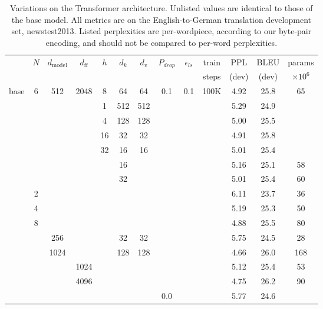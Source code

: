 \documentclass{article}
\newcommand{\dmodel}{d_{\text{model}}}
\newcommand{\dff}{d_{\text{ff}}}
\begin{document}
\begin{table}[t]
\caption{Variations on the Transformer architecture. Unlisted values are identical to those of the base model.  All metrics are on the English-to-German translation development set, newstest2013.  Listed perplexities are per-wordpiece, according to our byte-pair encoding, and should not be compared to per-word perplexities.}
\label{tab:variations}
\begin{center}
\vspace{-2mm}
\begin{tabular}{c|ccccccccc|ccc}
\hline\rule{0pt}{2.0ex}
 & \multirow{2}{*}{$N$} & \multirow{2}{*}{$\dmodel$} &
\multirow{2}{*}{$\dff$} & \multirow{2}{*}{$h$} & 
\multirow{2}{*}{$d_k$} & \multirow{2}{*}{$d_v$} & 
\multirow{2}{*}{$P_{drop}$} & \multirow{2}{*}{$\epsilon_{ls}$} &
train & PPL & BLEU & params \\
 & & & & & & & & & steps & (dev) & (dev) & $\times10^6$ \\
\hline\rule{0pt}{2.0ex}
base & 6 & 512 & 2048 & 8 & 64 & 64 & 0.1 & 0.1 & 100K & 4.92 & 25.8 & 65 \\
\hline\rule{0pt}{2.0ex}
\multirow{4}{*}{(A)}
& & & & 1 & 512 & 512 & & & & 5.29 & 24.9 &  \\
& & & & 4 & 128 & 128 & & & & 5.00 & 25.5 &  \\
& & & & 16 & 32 & 32 & & & & 4.91 & 25.8 &  \\
& & & & 32 & 16 & 16 & & & & 5.01 & 25.4 &  \\
\hline\rule{0pt}{2.0ex}
\multirow{2}{*}{(B)}
& & & & & 16 & & & & & 5.16 & 25.1 & 58 \\
& & & & & 32 & & & & & 5.01 & 25.4 & 60 \\
\hline\rule{0pt}{2.0ex}
\multirow{7}{*}{(C)}
& 2 & & & & & & & &            & 6.11 & 23.7 & 36 \\
& 4 & & & & & & & &            & 5.19 & 25.3 & 50 \\
& 8 & & & & & & & &            & 4.88 & 25.5 & 80 \\
& & 256 & & & 32 & 32 & & &    & 5.75 & 24.5 & 28 \\
& & 1024 & & & 128 & 128 & & & & 4.66 & 26.0 & 168 \\
& & & 1024 & & & & & &         & 5.12 & 25.4 & 53 \\
& & & 4096 & & & & & &         & 4.75 & 26.2 & 90 \\
\hline\rule{0pt}{2.0ex}
\multirow{4}{*}{(D)}
& & & & & & & 0.0 & & & 5.77 & 24.6 &  \\

\end{tabular}
\end{center}
\end{table}
\end{document}
